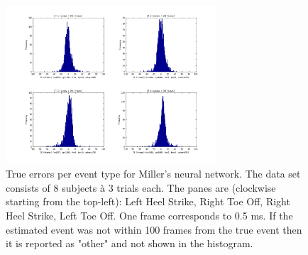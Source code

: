 \documentclass{acm_proc_article-sp}
\begin{document}
\begin{figure}[t]
\begin{center}
\includegraphics[width=0.70\textwidth]{figures/trueErrorsPerEventType_miller.png}
\end{center}
\caption{
True errors per event type for Miller's neural network.
The data set consists of 8 subjects à 3 trials each.
The panes are (clockwise starting from the top-left):
Left Heel Strike, Right Toe Off, Right Heel Strike, Left Toe Off.
One frame corresponds to 0.5 ms.
If the estimated event was not within 100 frames from the true event then it is reported as "other" and not shown in the histogram.
}
\label{fig:miller}
\end{figure}

\end{document}
